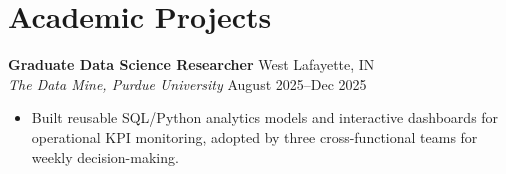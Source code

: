 \documentclass[11pt,a4paper]{article}
\begin{document}
\section*{Academic Projects}
\noindent
\textbf{Graduate Data Science Researcher} \hfill West Lafayette, IN \\
\textit{The Data Mine, Purdue University} \hfill August 2025--Dec 2025
\begin{itemize}[leftmargin=*, noitemsep, topsep=0pt]
    \item Built reusable SQL/Python analytics models and interactive dashboards for operational KPI monitoring, adopted by three cross-functional teams for weekly decision-making.
\end{itemize}
\end{document}
